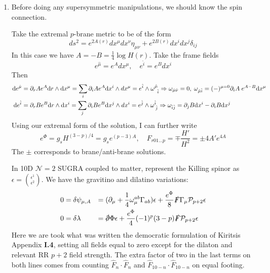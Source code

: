 \documentclass[11pt, class=article, crop=false]{standalone}
\begin{document}
\begin{enumerate}
	\item Before doing any supersymmetric manipulations, we should know the spin connection.
	
	Take the extremal $p$-brane metric to be of the form
	\[
		ds^2 = e^{2 A(r)} dx^\mu dx^\nu \eta_{\mu \nu} + e^{2 B(r)} dx^i dx^j \delta_{ij}
	\]
	In this case we have $A = - B = \frac14 \log H(r)$. Take the frame fields
	\[
		e^{\hat \mu} = e^A dx^\mu, \quad e^{\hat i} = e^B dx^{i}
	\]
	Then
	\[
		\begin{aligned}
			\mathrm{d} e^{\hat \mu} &= \partial_r A e^{A} \mathrm{d} r \wedge \mathrm{d} x^\mu = \sum_i \partial_i A e^A \mathrm{d} x^i \wedge dx^\mu = e^{\hat i} \wedge \omega^{\hat \mu}_{\;\; \hat i} \Rightarrow  \omega_{\hat \mu \hat \nu} = 0, \; \omega_{\hat \mu \hat i} = (-)^{\mu=0} \partial_i A \; e^{A - B} \mathrm{d} x^\mu \\
			\mathrm{d} e^{\hat i} &= \partial_r B e^{B} \mathrm{d} r \wedge \mathrm{d} x^i = \sum_j \partial_i B e^B \mathrm{d} x^j \wedge dx^i = e^{\hat j} \wedge \omega^{\hat i}_{\; \hat j}
			\Rightarrow \omega_{\hat i \hat j} = \partial_j B \mathrm{d} x^i - \partial_i B \mathrm{d} x^j \\
		\end{aligned}
	\]
	Using our extremal form of the solution, I can further write
	\[
		e^{\Phi} = g_s H^{(3-p)/4} = g_s e^{(p-3) A}, \quad F_{r01\dots p} = \mp \frac{H'}{H^2} = \pm 4 A' e^{4A}
	\]
	The $\pm$ corresponds to brane/anti-brane solutions.
%
	
	In 10D $\mathcal N = 2$ SUGRA coupled to matter, represent the Killing spinor as $\epsilon = {\epsilon^1 \choose \epsilon^2}$. We have the gravitino and dilatino variations:
	\[
	\begin{aligned}
		0 &=
		 \delta \psi_{\mu, A} & = & \; (\d_\mu + \frac14 \omega_{\mu}^{ab} \Gamma_{ab}) \epsilon + \frac{e^\Phi}{8} \slashed{F} \Gamma_\mu \mathcal P_{p+2} \epsilon \\
		0 &= \delta \lambda & =& \; \slashed{\d} \Phi \epsilon  + \frac{e^{\Phi}}{4} (-1)^p (3-p) \slashed F \mathcal P_{p+2} \epsilon
	\end{aligned}
	\]
	Here we are took what was written the democratic formulation of Kiritsis Appendix \textbf{I.4}, setting all fields equal to zero except for the dilaton and relevant RR $p+2$ field strength. The extra factor of two in the last terms on both lines comes from counting $\hat F_n \cdot \hat F_n$ and $\hat F_{10-n} \cdot \hat F_{10-n}$ on equal footing.
	

\end{enumerate}
\end{document}
